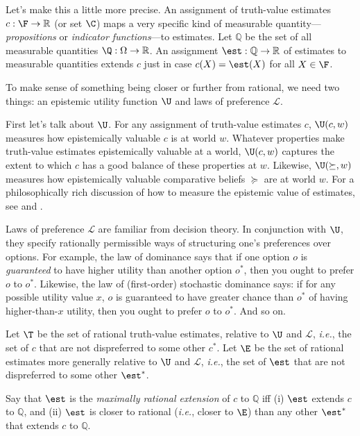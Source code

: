 Let's make this a little more precise. An assignment of truth-value estimates $c:\F\rightarrow\mathbb{R}$ (or set $\C$) maps a very specific kind of measurable quantity---\textit{propositions} or \textit{indicator functions}---to estimates. Let $\mathbb{Q}$ be the set of all measurable quantities $\Q:\Omega\rightarrow\mathbb{R}$. An assignment $\est:\mathbb{Q}\rightarrow\mathbb{R}$ of estimates to measurable quantities extends $c$ just in case $c(X)=\est(X)$ for all $X\in\F$.

To make sense of something being closer or further from rational, we need two things: an epistemic utility function $\U$ and laws of preference $\mathcal{L}$.

First let's talk about $\U$. For any assignment of truth-value estimates $c$, $\U(c,w)$ measures how epistemically valuable $c$ is at world $w$. Whatever properties make truth-value estimates epistemically valuable at a world, $\U(c,w)$ captures the extent to which $c$ has a good balance of these properties at $w$. Likewise, $\U(\succeq,w)$ measures how epistemically valuable comparative beliefs $\succeq$ are at world $w$. For a philosophically rich discussion of how to measure the epistemic value of estimates, see \citet{Joyce2009} and \citet{Pettigrew2016}.

Laws of preference $\mathcal{L}$ are familiar from decision theory. In conjunction with $\U$, they specify rationally permissible ways of structuring one's preferences over options. For example, the law of dominance says that if one option $o$ is \textit{guaranteed} to have higher utility than another option $o^*$, then you ought to prefer $o$ to $o^*$. Likewise, the law of (first-order) stochastic dominance says: if for any possible utility value $x$, $o$ is guaranteed to have greater chance than $o^*$ of having higher-than-$x$ utility, then you ought to prefer $o$ to $o^*$. And so on.

Let $\T$ be the set of rational truth-value estimates, relative to $\U$ and $\mathcal{L}$, \textit{i.e.}, the set of $c$ that are not dispreferred to some other $c^*$. Let $\E$ be the set of rational estimates more generally relative to $\U$ and $\mathcal{L}$, \textit{i.e.}, the set of $\est$ that are not dispreferred to some other $\est^*$.

Say that $\est$ is the \textit{maximally rational extension} of $c$ to $\mathbb{Q}$ iff (i) $\est$ extends $c$ to $\mathbb{Q}$, and (ii) $\est$ is closer to rational (\textit{i.e.}, closer to $\E$) than any other $\est^*$ that extends $c$ to $\mathbb{Q}$.

